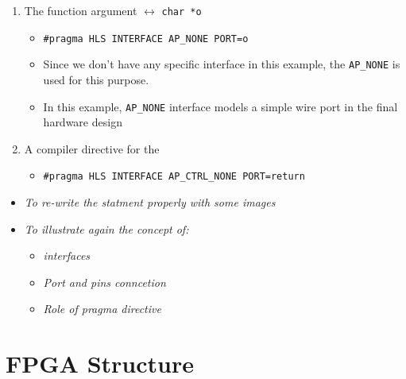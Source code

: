 \begin{enumerate}

\item The function argument $\leftrightarrow$ \verb|char *o|

	\begin{itemize}
	\item \verb|#pragma HLS INTERFACE AP_NONE PORT=o| 
	
	\item Since we don’t have any specific interface in this example, the \verb|AP_NONE| is used for this purpose. 
	
	\item In this example, \verb|AP_NONE| interface models a simple wire port in the final hardware design
	\end{itemize}

\item A compiler directive for the 

	\begin{itemize}
	\item \verb|#pragma HLS INTERFACE AP_CTRL_NONE PORT=return|
	\end{itemize}

\end{enumerate}



 

\begin{itemize}

\item \textit{To re-write the statment properly with some images}

\item \textit{To illustrate again the concept of:}

	\begin{itemize}
	\item \textit{interfaces}
	
	\item \textit{Port and pins conncetion}
	
	\item \textit{Role of pragma directive}
	\end{itemize}

\end{itemize}

\newpage
\section{FPGA Structure}

